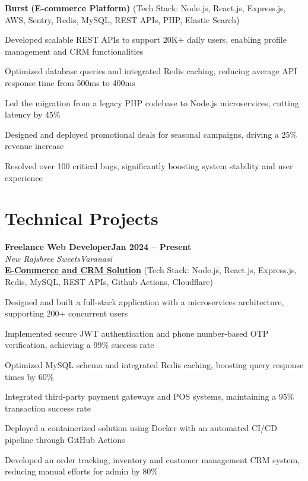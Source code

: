 \documentclass[letterpaper, 10pt]{article}
\newcommand{\heading}[2]{ \hspace{6pt}#1\hfill#2\\[0.8pt] }
\newcommand{\headingBf}[2]{ \heading{\textbf{#1}}{\textbf{#2}} }
\newcommand{\headingIt}[2]{ \heading{\textit{#1}}{\textit{#2}} }
\newenvironment{resume_list}{
\vspace{-5pt}
\begin{itemize}[itemsep=-3pt, parsep=0.2pt, leftmargin=20pt] }{ \end{itemize}
\vspace{-4pt}
}
\begin{document}
	\hspace{10pt}\textbf{Burst} \textbf{(E-commerce Platform)} \small{(Tech Stack: Node.js, React.js, Express.js, AWS, Sentry, Redis, MySQL, REST APIs, PHP, Elastic Search)}
	\vspace{1pt}
	\begin{resume_list}
		\item Developed scalable REST APIs to support 20K+ daily users, enabling profile
		management and CRM functionalities \item Optimized database queries and integrated
		Redis caching, reducing average API response time from 500ms to 400ms \item
		Led the migration from a legacy PHP codebase to Node.js microservices, cutting
		latency by 45\% \item Designed and deployed promotional deals for seasonal
		campaigns, driving a 25\% revenue increase \item Resolved over 100 critical
		bugs, significantly boosting system stability and user experience
	\end{resume_list}

	\section{Technical Projects}
	\headingBf{Freelance Web Developer}{Jan 2024 -- Present}
	\vspace{1pt}
	\headingIt{New Rajshree Sweets}{Varanasi}
	\vspace{2pt}
	\hspace{10pt}\textbf{\href{https://newrajshreesweets.com}{\underline{E-Commerce and CRM Solution}}}
	\small{(Tech Stack: Node.js, React.js, Express.js, Redis, MySQL, REST APIs, Github Actions, Cloudflare)}
	\vspace{1pt}
	\begin{resume_list}
		\item Designed and built a full-stack application with a microservices architecture,
		supporting 200+ concurrent users \item Implemented secure JWT authentication
		and phone number-based OTP verification, achieving a 99\% success rate \item
		Optimized MySQL schema and integrated Redis caching, boosting query response
		times by 60\% \item Integrated third-party payment gateways and POS systems,
		maintaining a 95\% transaction success rate \item Deployed a containerized solution
		using Docker with an automated CI/CD pipeline through GitHub Actions \item Developed
		an order tracking, inventory and customer management CRM system, reducing manual
		efforts for admin by 80\%
	\end{resume_list}
\end{document}
